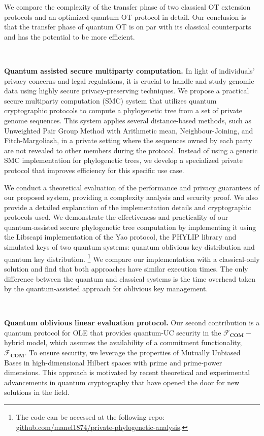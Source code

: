 We compare the complexity of the transfer phase of two classical OT extension protocols \cite{ALSZ13, KOS15} and an optimized quantum OT protocol in detail. Our conclusion is that the transfer phase of quantum OT is on par with its classical counterparts and has the potential to be more efficient.

\

\noindent\textbf{Quantum assisted secure multiparty computation.} In light of individuals' privacy concerns and legal regulations, it is crucial to handle and study genomic data using highly secure privacy-preserving techniques. We propose a practical secure multiparty computation (SMC) system that utilizes quantum cryptographic protocols to compute a phylogenetic tree from a set of private genome sequences. This system applies several distance-based methods, such as Unweighted Pair Group Method with Arithmetic mean, Neighbour-Joining, and Fitch-Margoliash, in a private setting where the sequences owned by each party are not revealed to other members during the protocol. Instead of using a generic SMC implementation for phylogenetic trees, we develop a specialized private protocol that improves efficiency for this specific use case.


We conduct a theoretical evaluation of the performance and privacy guarantees of our proposed system, providing a complexity analysis and security proof. We also provide a detailed explanation of the implementation details and cryptographic protocols used. We demonstrate the effectiveness and practicality of our quantum-assisted secure phylogenetic tree computation by implementing it using the Libscapi implementation of the Yao protocol, the PHYLIP library and simulated keys of two quantum systems: quantum oblivious key distribution and quantum key distribution. \footnote{ The code can be accessed at the following repo: \href{https://github.com/manel1874/private-phylogenetic-analysis}{github.com/manel1874/private-phylogenetic-analysis}.} We compare our implementation with a classical-only solution and find that both approaches have similar execution times. The only difference between the quantum and classical systems is the time overhead taken by the quantum-assisted approach for oblivious key management.

\

\noindent\textbf{Quantum oblivious linear evaluation protocol.} Our second contribution is a quantum protocol for OLE that provides quantum-UC security in the $\mathcal{F}_{\textbf{COM}}-$hybrid model, which assumes the availability of a commitment functionality, $\mathcal{F}_{\textbf{COM}}$. To ensure security, we leverage the properties of Mutually Unbiased Bases in high-dimensional Hilbert spaces with prime and prime-power dimensions. This approach is motivated by recent theoretical and experimental advancements in quantum cryptography \cite{BPT00,DEBZ10,Zhongetal2015,BHVBFHM18,DHMPPV21} that have opened the door for new solutions in the field.

